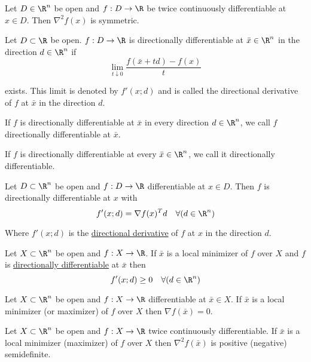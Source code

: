 \label{c3524e9}

Let $D\in\R^n$ be open and $f:D\to\R$ be twice continuously differentiable at
$x\in D$. Then $\nabla^2f(x)$ is symmetric.

\label{b7d1188}

Let $D\subset \R$ be open. $f:D\to\R$ is directionally differentiable at $\bar
x\in\R^n$ in the direction $d\in\R^n$ if
$$
  \lim_{t\downarrow0}\frac{f(\bar x+td)-f(x)}t
$$

exists. This limit is denoted by $f'(x;d)$ and is called the directional
derivative of $f$ at $\bar x$ in the direction $d$.

If $f$ is directionally differentiable at $\bar x$ in every direction
$d\in\R^n$, we call $f$ directionally differentiable at $\bar x$.

If $f$ is directionally differentiable at every $\bar x\in\R^n$, we call it
directionally differentiable.

\label{ed67d29}

Let $D\subset \R^n$ be open and $f:D\to\R$ differentiable at $x\in D$. Then $f$
is directionally differentiable at $x$ with
$$
  f'(x;d)=\nabla f(x)^Td\quad\forall(d\in\R^n)
$$

Where $f'(x;d)$ is the \href{b7d1188}{directional derivative} of $f$ at $x$ in
the direction $d$.

\label{b3b5e10}

Let $X\subset\R^n$ be open and $f:X\to\R$. If $\bar x$ is a local minimizer of
$f$ over $X$ and $f$ is \href{b7d1188}{directionally differentiable} at $\bar
x$ then
$$
  f'(x;d)\geq 0\quad\forall(d\in\R^n)
$$

\label{dc165c9}

Let $X\subset\R^n$ be open and $f:X\to\R$ differentiable at $\bar x\in X$. If
$\bar x$ is a local minimizer (or maximizer) of $f$ over $X$ then $\nabla
f(\bar x)=0$.

\label{ce5370d}

Let $X\subset\R^n$ be open and $f:X\to\R$ twice continuously differentiable. If
$\bar x$ is a local minimizer (maximizer) of $f$ over $X$ then $\nabla^2f(\bar
x)$ is positive (negative) semidefinite.

